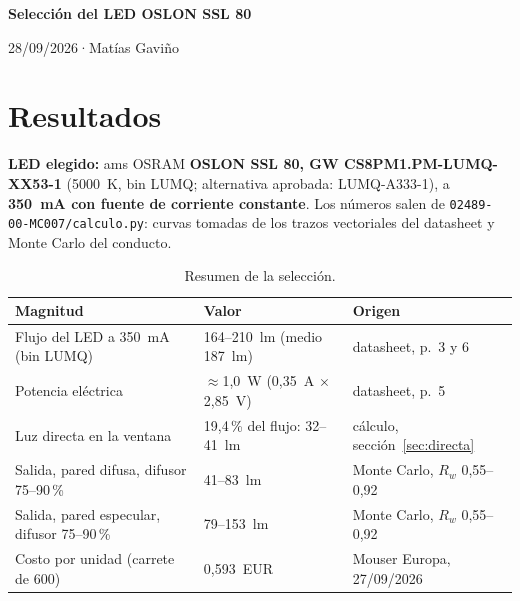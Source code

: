 \documentclass[11pt,a4paper]{article}
\newcommand{\titulo}{Selección del LED OSLON SSL 80}
\newcommand{\autor}{Matías Gaviño}
\newcommand{\fecha}{28/09/2026}                    %
\newcommand{\cabecera}{%
  \thispagestyle{fancy}%
  {\fontsize{20}{24}\selectfont\bfseries\titulo\par}%
  \vspace{5pt}%
  {\small\color{gris-medio}\fecha\quad·\quad\autor\par}%
  \vspace{6pt}}
\begin{document}
\cabecera

\section{Resultados}
\textbf{LED elegido:} ams OSRAM \textbf{OSLON SSL 80, GW CS8PM1.PM-LUMQ-XX53-1} (5000~K, bin LUMQ;
alternativa aprobada: LUMQ-A333-1), a \textbf{350~mA con fuente de corriente constante}. Los números salen de
\texttt{02489-00-MC007/calculo.py}: curvas tomadas de los trazos vectoriales del datasheet y Monte Carlo del
conducto.

\begin{table}[H]\centering\small
\begin{tabular}{l l l}
\toprule
Magnitud & Valor & Origen\\
\midrule
Flujo del LED a 350~mA (bin LUMQ)     & 164--210~lm (medio 187~lm) & datasheet, p.~3 y 6\\
Potencia eléctrica                   & $\approx$1,0~W (0,35~A $\times$ 2,85~V) & datasheet, p.~5\\
Luz directa en la ventana            & 19,4\,\% del flujo: 32--41~lm & cálculo, sección~\ref{sec:directa}\\
Salida, pared difusa, difusor 75--90\,\% & 41--83~lm & Monte Carlo, $R_w$ 0,55--0,92\\
Salida, pared especular, difusor 75--90\,\% & 79--153~lm & Monte Carlo, $R_w$ 0,55--0,92\\
Costo por unidad (carrete de 600)    & 0,593~EUR & Mouser Europa, 27/09/2026\\
\bottomrule
\end{tabular}
\caption{Resumen de la selección.}
\end{table}
\end{document}
